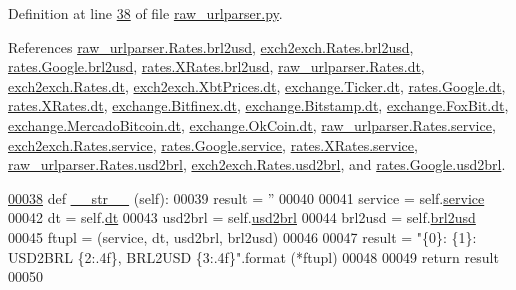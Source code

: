 Definition at line \hyperlink{raw__urlparser_8py_source_l00038}{38} of file \hyperlink{raw__urlparser_8py_source}{raw\+\_\+urlparser.\+py}.



References \hyperlink{raw__urlparser_8py_source_l00026}{raw\+\_\+urlparser.\+Rates.\+brl2usd}, \hyperlink{exch2exch_8py_source_l00030}{exch2exch.\+Rates.\+brl2usd}, \hyperlink{rates_8py_source_l00090}{rates.\+Google.\+brl2usd}, \hyperlink{rates_8py_source_l00145}{rates.\+X\+Rates.\+brl2usd}, \hyperlink{raw__urlparser_8py_source_l00024}{raw\+\_\+urlparser.\+Rates.\+dt}, \hyperlink{exch2exch_8py_source_l00028}{exch2exch.\+Rates.\+dt}, \hyperlink{exch2exch_8py_source_l00057}{exch2exch.\+Xbt\+Prices.\+dt}, \hyperlink{exchange_8py_source_l00057}{exchange.\+Ticker.\+dt}, \hyperlink{rates_8py_source_l00087}{rates.\+Google.\+dt}, \hyperlink{rates_8py_source_l00143}{rates.\+X\+Rates.\+dt}, \hyperlink{exchange_8py_source_l00330}{exchange.\+Bitfinex.\+dt}, \hyperlink{exchange_8py_source_l00399}{exchange.\+Bitstamp.\+dt}, \hyperlink{exchange_8py_source_l00463}{exchange.\+Fox\+Bit.\+dt}, \hyperlink{exchange_8py_source_l00533}{exchange.\+Mercado\+Bitcoin.\+dt}, \hyperlink{exchange_8py_source_l00598}{exchange.\+Ok\+Coin.\+dt}, \hyperlink{raw__urlparser_8py_source_l00027}{raw\+\_\+urlparser.\+Rates.\+service}, \hyperlink{exch2exch_8py_source_l00031}{exch2exch.\+Rates.\+service}, \hyperlink{rates_8py_source_l00092}{rates.\+Google.\+service}, \hyperlink{rates_8py_source_l00147}{rates.\+X\+Rates.\+service}, \hyperlink{raw__urlparser_8py_source_l00025}{raw\+\_\+urlparser.\+Rates.\+usd2brl}, \hyperlink{exch2exch_8py_source_l00029}{exch2exch.\+Rates.\+usd2brl}, and \hyperlink{rates_8py_source_l00089}{rates.\+Google.\+usd2brl}.


\begin{DoxyCode}
\hypertarget{classraw__urlparser_1_1_rates.tex_l00038}{}\hyperlink{classraw__urlparser_1_1_rates_a3e8a9922ba7e95bd54945c87d07e5f0e}{00038}     \textcolor{keyword}{def }\hyperlink{classraw__urlparser_1_1_rates_a3e8a9922ba7e95bd54945c87d07e5f0e}{\_\_str\_\_} (self):
00039         result = \textcolor{stringliteral}{''}
00040 
00041         service = self.\hyperlink{classraw__urlparser_1_1_rates_acb05316e95a39bc42590a882712f854b}{service}
00042         dt      = self.\hyperlink{classraw__urlparser_1_1_rates_a09b3c7cb595f3135c3eda648b1bb4c3f}{dt}
00043         usd2brl = self.\hyperlink{classraw__urlparser_1_1_rates_a52d9b688be8385a87783b27839749b4a}{usd2brl}
00044         brl2usd = self.\hyperlink{classraw__urlparser_1_1_rates_adc9df007bec75344f9f89cb631d1aeb3}{brl2usd}
00045         ftupl = (service, dt, usd2brl, brl2usd)
00046         
00047         result = \textcolor{stringliteral}{"\{0\}: \{1\}: USD2BRL \{2:.4f\}, BRL2USD \{3:.4f\}"}.format (*ftupl)
00048 
00049         \textcolor{keywordflow}{return} result        
00050         
\end{DoxyCode}
